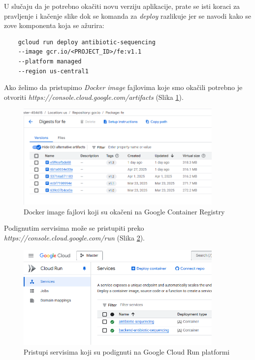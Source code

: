 \documentclass[12pt,oneside]{memoir}
\begin{document}
U slučaju da je potrebno okačiti novu verziju aplikacije, prate se isti koraci za pravljenje i kačenje slike dok se komanda za \emph{deploy} razlikuje jer se navodi kako se zove komponenta koja se ažurira:
\begin{verbatim}
    gcloud run deploy antibiotic-sequencing 
    --image gcr.io/<PROJECT_ID>/fe:v1.1 
    --platform managed 
    --region us-central1
\end{verbatim}

Ako želimo da pristupimo \emph{Docker image} fajlovima koje smo okačili potrebno je otvoriti \emph{https://console.cloud.google.com/artifacts} (Slika \ref{fig:gcr_images}).
\begin{figure}[h]
\centering
\includegraphics[width=0.9\textwidth]{images/gcr_images.png}
\caption{Docker image fajlovi koji su okačeni na Google Container Registry}
\label{fig:gcr_images}
\end{figure}

Podignutim servisima može se pristupiti preko \emph{https://console.cloud.google.com/run} (Slika \ref{fig:gcr_services}).

\begin{figure}[h]
\centering
\includegraphics[width=0.9\textwidth]{images/gcr_services.png}
\caption{Pristupi servisima koji su podignuti na Google Cloud Run platformi}
\label{fig:gcr_services}
\end{figure}
\end{document}
